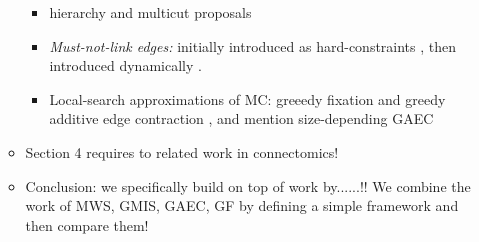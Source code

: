 \begin{itemize}
\begin{itemize}
\begin{itemize}
\item hierarchy and multicut proposals \cite{funke2018candidate}
\item \textit{Must-not-link edges:} initially introduced as hard-constraints \cite{malmberg2011generalized}, then introduced dynamically \cite{wolf2018mutex,levinkov2017comparative}. 
\item Local-search approximations of MC: greeedy fixation and greedy additive edge contraction \cite{levinkov2017comparative}, and mention size-depending GAEC
\end{itemize}
\item Section 4 requires to related work in connectomics!
\item Conclusion: we specifically build on top of work by......!! We combine the work of MWS, GMIS, GAEC, GF by defining a simple framework and then compare them!
\end{itemize}

\end{itemize}

